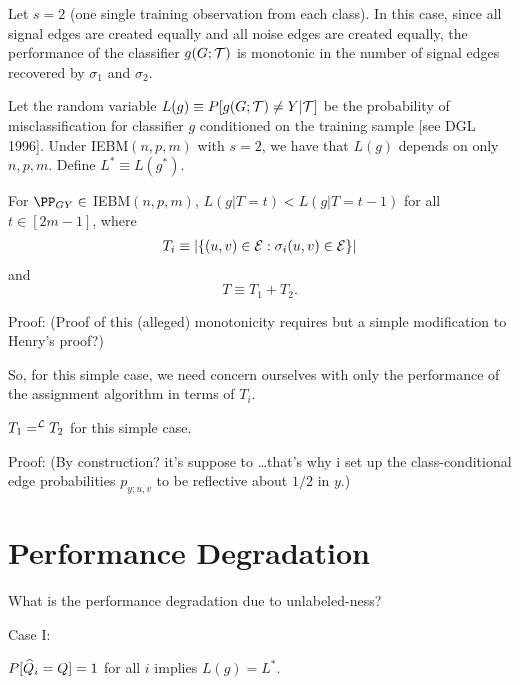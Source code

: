 Let $s=2$ (one single training observation from each class).
In this case, since all signal edges are created equally and all noise edges are created equally,
the performance of the classifier $g(G;\mathcal{T})$
is monotonic in the number of signal edges recovered by $\sigma_1$ and $\sigma_2$.


Let the random variable $L(g) \equiv P[g(G;\mathcal{T}) \neq Y| \mathcal{T}]$
be the probability of misclassification for classifier $g$
conditioned on the training sample [see DGL 1996].
Under IEBM$(n,p,m)$ with $s=2$, we have that $L(g)$ depends on only $n,p,m$.
Define $L^* \equiv L(g^*)$.

\thma
For $\PP_{GY} \in$ IEBM$(n,p,m)$,
$L(g|T=t) < L(g|T=t-1)$ for all $t \in [2m-1]$,
where
\begin{eqnarray}
T_i \equiv |\{(u,v) \in \mathcal{E}: \sigma_i(u,v) \in \mathcal{E}\}|
\end{eqnarray}
and
$$T \equiv T_1 + T_2.$$
\thmb

Proof:
(Proof of this (alleged) monotonicity requires but a simple modification to Henry's proof?)

So, for this simple case,
we need concern ourselves with only the performance of the assignment algorithm in terms of $T_i$.

\thma
$T_1 =^{\mathcal{L}} T_2$ for this simple case.
\thmb

Proof:
(By construction? it's suppose to \dots that's why i set up the class-conditional edge probabilities
 $p_{y;u,v}$ to be reflective about $1/2$ in $y$.)




\section{Performance Degradation}

What is the performance degradation due to unlabeled-ness?

Case I:

\thma
$P[\widehat{Q}_i = Q]=1$ for all $i$ implies $L(g)=L^*$.
\thmb

